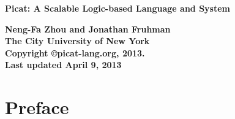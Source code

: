 \documentclass[11pt]{report}
\begin{document}
\vspace*{4cm}
\begin{center}
{\Huge\bf Picat: A Scalable Logic-based Language and System} \\

\vspace*{8cm}

{\large\bf Neng-Fa Zhou and Jonathan Fruhman} \\
{\large\bf The City University of New York} \\
\vspace*{1cm}
{\bf Copyright \copyright picat-lang.org, 2013.} \\
{\bf Last updated April 9, 2013} \\
\end{center}
\thispagestyle{empty}
\clearpage

\pagestyle{plain}

\section*{Preface}



\tableofcontents

\cleardoublepage
\pagestyle{plain}
\setcounter{page}{1}























\begin{adjustwidth}{-2cm}{-1cm}

\end{adjustwidth}
\printindex
\end{document}
